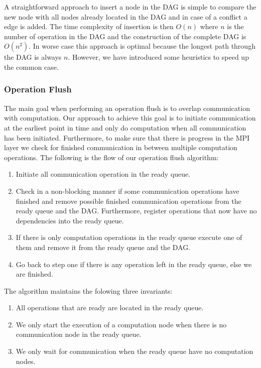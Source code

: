 \documentclass[preprint]{../PGAS10/sigplanconf}
\begin{document}
A straightforward approach to insert a node in the DAG is simple to compare the new node with all nodes already located in the DAG and in case of a conflict a edge is added. The time complexity of insertion is then $O(n)$ where $n$ is the number of operation in the DAG and the construction of the complete DAG is $O(n^2)$. In worse case this approach is optimal because the longest path through the DAG is always $n$. However, we have introduced some heuristics to speed up the common case. 

\subsubsection{Operation Flush}
The main goal when performing an operation flush is to overlap communication with computation. Our approach to achieve this goal is to initiate communication at the earliest point in time and only do computation when all communication has been initiated. Furthermore, to make sure that there is progress in the MPI layer we check for finished communication in between multiple computation operations. The following is the flow of our operation flush algorithm:
\begin{enumerate}
\item Initiate all communication operation in the ready queue.
\item Check in a non-blocking manner if some communication operations have finished and remove possible finished communication operations from the ready queue and the DAG. Furthermore, register operations that now have no dependencies into the ready queue.
\item If there is only computation operations in the ready queue execute one of them and remove it from the ready queue and the DAG.
\item Go back to step one if there is any operation left in the ready queue, else we are finished.
\end{enumerate}
The algorithm maintains the folowing three invariants:
\begin{enumerate}
\item All operations that are ready are located in the ready queue.
\item We only start the execution of a computation node when there is no communication node in the ready queue.
\item We only wait for communication when the ready queue have no computation nodes.
\end{enumerate}
\end{document}
